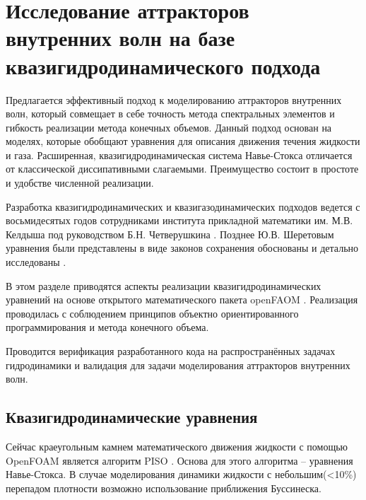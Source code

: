 \section{Исследование аттракторов внутренних волн на базе квазигидродинамического подхода}

Предлагается эффективный подход к моделированию аттракторов внутренних волн, который совмещает в себе точность метода спектральных элементов и гибкость реализации метода конечных объемов. Данный подход основан на моделях, которые обобщают уравнения для описания движения течения жидкости и газа. Расширенная, квазигидродинамическая система Навье-Стокса отличается от классической диссипативными слагаемыми. Преимущество состоит в простоте и удобстве численной реализации.

 Разработка квазигидродинамических и квазигазодинамических подходов ведется с восьмидесятых годов сотрудниками института прикладной математики им. М.В. Келдыша под руководством Б.Н. Четверушкина \cite{ElizarBook}. Позднее Ю.В. Шеретовым уравнения были представлены в виде законов сохранения обоснованы и детально исследованы  \cite{Elizarova1999}.

В этом разделе приводятся аспекты реализации квазигидродинамических уравнений на основе открытого математического пакета openFAOM \cite{OpenFOAM}. Реализация проводилась с соблюдением принципов объектно ориентированного программирования и метода конечного объема.

Проводится верификация разработанного кода на распространённых задачах гидродинамики и валидация для задачи моделирования аттракторов внутренних волн.

\subsection{Квазигидродинамические уравнения}

Сейчас краеугольным камнем математического движения жидкости с помощью OpenFOAM является алгоритм PISO \cite{IssaGosmanWatkins-PISO}. Основа для этого алгоритма -- уравнения Навье-Стокса. В случае моделирования динамики жидкости с небольшим(<10\%) перепадом плотности возможно использование приближения Буссинеска. 

